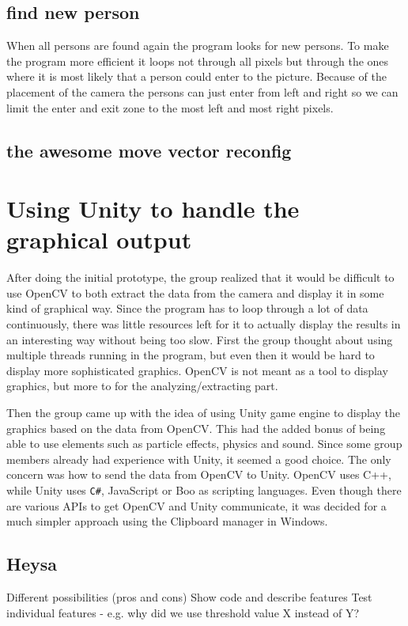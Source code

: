 \subsection{find new person}

When all persons are found again the program looks for new persons. To make the program more efficient it loops not through all pixels but through the ones where it is most likely that a person could enter to the picture. Because of the placement of the camera the persons can just enter from left and right so we can limit the enter and exit zone to the most left and most right pixels. 

\subsection{the awesome move vector reconfig}

\section{Using Unity to handle the graphical output}
After doing the initial prototype, the group realized that it would be difficult to use OpenCV to both extract the data from the camera and display it in some kind of graphical way. Since the program has to loop through a lot of data continuously, there was little resources left for it to actually display the results in an interesting way without being too slow. First the group thought about using multiple threads running in the program, but even then it would be hard to display more sophisticated graphics. OpenCV is not meant as a tool to display graphics, but more to for the analyzing/extracting part.

Then the group came up with the idea of using Unity game engine to display the graphics based on the data from OpenCV. This had the added bonus of being able to use elements such as particle effects, physics and sound. Since some group members already had experience with Unity, it seemed a good choice. The only concern was how to send the data from OpenCV to Unity. OpenCV uses C++, while Unity uses \texttt{C\#}, JavaScript or Boo as scripting languages. Even though there are various APIs to get OpenCV and Unity communicate, it was decided for a much simpler approach using the Clipboard manager in Windows.

\subsection{Heysa}
Different possibilities (pros and cons)
Show code and describe features
Test individual features - e.g. why did we use threshold value X instead of Y?

